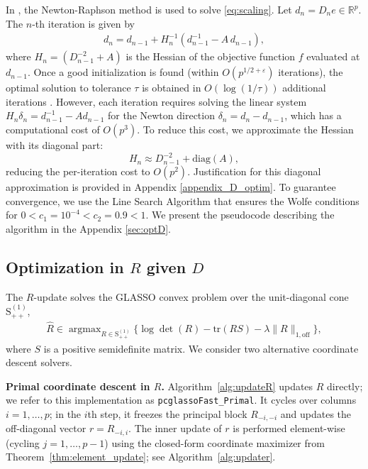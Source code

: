 \documentclass[12pt]{amsart}
\numberwithin{equation}{section}
\numberwithin{equation}{section}
\theoremstyle{plain}
\theoremstyle{definition}
\DeclareMathOperator*{\argmax}{\arg\max}
\newcommand{\tr}{\mathrm{tr}}
\newcommand{\diag}[1]{\mathrm{diag}(#1)}
\newcommand{\Sppone}{\mathrm{S}_{++}^{(1)}}
\newcommand{\R}{\mathbb{R}}
\begin{document}
In \cite{Kal92},  the Newton-Raphson method is used to solve \eqref{eq:scaling}. Let $d_n=D_ne\in\R^p$.  The $n$-th iteration is given by
\begin{align}\label{eq:NR}
d_n = d_{n-1}+ H_n^{-1} (d_{n-1}^{-1}-A\, d_{n-1}),
\end{align}
where $H_n = (D_{n-1}^{-2}+A)$ is the Hessian of the objective function $f$ evaluated at $d_{n-1}$. Once a good initialization is found (within 
$O(p^{1/2+\varepsilon})$ iterations), the optimal solution to tolerance $\tau$ is obtained in $O(\log(1/\tau))$ additional iterations \cite{Kal92}. However, each iteration requires solving the linear system $H_n \delta_n = d_{n-1}^{-1}-Ad_{n-1}$ for the Newton direction $\delta_n=d_n-d_{n-1}$, which has a computational cost of $O(p^3)$. To reduce this cost, we approximate the Hessian with its diagonal part:
\[
H_n \approx  D_{n-1}^{-2}+\diag{A},
\]
reducing the per-iteration cost to $O(p^2)$. Justification for this diagonal approximation is provided in Appendix \ref{appendix_D_optim}. %
To guarantee convergence, we use the Line Search Algorithm that ensures the Wolfe conditions for $0 < c_1 = 10^{-4} < c_2 = 0.9 < 1$. We present the pseudocode describing the algorithm in the Appendix  \ref{sec:optD}.


\subsection{Optimization in \texorpdfstring{$R$ given $D$}{R given D}}\label{sec:algR}


The $R$-update solves the GLASSO convex problem over the
unit-diagonal cone $\Sppone$, 
\begin{align*}
\hat{R} \in \argmax_{R\in\Sppone}
\Big\{ \log\det(R) - \tr(RS) - \lambda\|R\|_{1,\mathrm{off}} \Big\},
\end{align*}
where $S$ is a positive semidefinite matrix.
We consider two alternative coordinate descent solvers.

\textbf{Primal coordinate descent in $R$.}
Algorithm~\ref{alg:updateR} updates $R$ directly; we refer to this implementation as \texttt{pcglassoFast\_Primal}.
It cycles over columns $i=1,\dots,p$; in the $i$th step, it freezes the principal block
$R_{-i,-i}$ and updates the off-diagonal vector $r=R_{-i,i}$.
The inner update of $r$ is performed element-wise (cycling $j=1,\dots,p-1$) using the closed-form
coordinate maximizer from Theorem~\ref{thm:element_update}; see Algorithm~\ref{alg:updater}.
\end{document}
